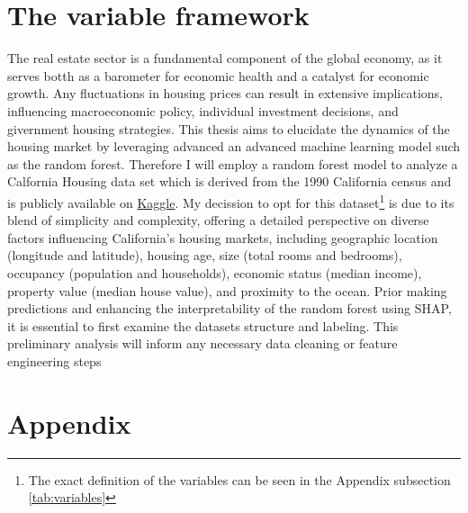 \documentclass[12pt]{article}
\begin{document}
\section{The variable framework}
The real estate sector is a fundamental component of the global economy, as it serves botth as a barometer for economic health and a catalyst for economic growth. Any fluctuations in housing prices can result in extensive implications, influencing macroeconomic policy, individual investment decisions, and givernment housing strategies. This thesis aims to elucidate the dynamics of the housing market by leveraging advanced an advanced machine learning model such as the random forest.
Therefore I will employ a random forest model to analyze a Calfornia Housing data set which is derived from the 1990 California census and is publicly available on \href{https://www.kaggle.com/datasets/camnugent/california-housing-prices}{Kaggle}.
My decission to opt for this dataset\footnote{The exact definition of the variables can be seen in the Appendix  subsection \ref{tab:variables}} is due to its blend of simplicity and complexity, offering a detailed perspective on diverse factors influencing California’s housing markets, including geographic location (longitude and latitude), housing age, size (total rooms and bedrooms), occupancy (population and households), economic status (median income), property value (median house value), and proximity to the ocean.
Prior making predictions and enhancing the interpretability of the random forest using SHAP, it is essential to first examine the datasets structure and labeling. This preliminary analysis will inform any necessary data cleaning or feature engineering steps
	
	
	
	
	
	
	

\section{Appendix}
\end{document}
